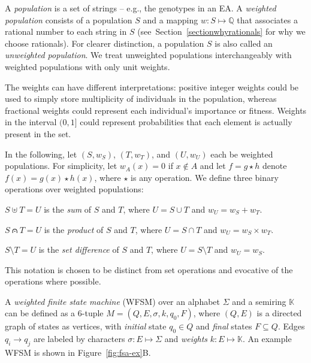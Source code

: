 \documentclass{llncs}
\begin{document}
A \emph{population} is a set of strings -- e.g., the genotypes in an EA.
A \emph{weighted population} consists of a population $S$ and a mapping $w : S \mapsto \mathbb{Q}$ that associates a rational number to each string in $S$ (see~Section~\ref{sectionwhyrationals} for why we choose rationals).
For clearer distinction, a population $S$ is also called an \emph{unweighted population}.
We treat unweighted populations interchangeably with weighted populations with only unit weights.

The weights can have different interpretations:
positive integer weights could be used to simply store multiplicity of individuals in the population,
whereas fractional weights could represent each individual's importance or fitness.
Weights in the interval $(0,1]$ could represent probabilities that each element is actually present in the set.

In the following, let $(S, w_S)$, $(T, w_T)$, and $(U, w_U)$ each be weighted populations.
For simplicity, let $w_A(x)=0$ if $x \notin A$ and let $f = g \star h$ denote $f(x) = g(x) \star h(x)$, where $\star$ is any operation.
We define three binary operations over weighted populations:

$S \uplus T = U$ is the \emph{sum} of $S$ and $T$, where $U = S \cup T$ and $w_U = w_S + w_T$.

$S \capdot T = U$ is the \emph{product} of $S$ and $T$, where $U = S \cap T$ and $w_U = w_S \times w_T$.

$S \setminus T = U$ is the \emph{set difference} of $S$ and $T$, where $U = S \setminus T$ and $w_U = w_S$.

This notation is chosen to be distinct from set operations and evocative of the operations where possible.


A \emph{weighted finite state machine} (WFSM) over an alphabet $\Sigma$ and a semiring $\mathbb{K}$ can be defined as a 6-tuple $M = (Q, E, \sigma, k, q_0, F)$,
where $(Q,E)$ is a directed graph of states as vertices,
with \emph{initial} state $q_0 \in Q$ and \emph{final} states $F \subseteq Q$.
Edges $q_i \to q_j$ are labeled by characters $\sigma : E \mapsto \Sigma$ and \emph{weights} $k : E \mapsto \mathbb{K}$.
An example WFSM is shown in Figure~\ref{fig:fsa-ex}B.
\end{document}
